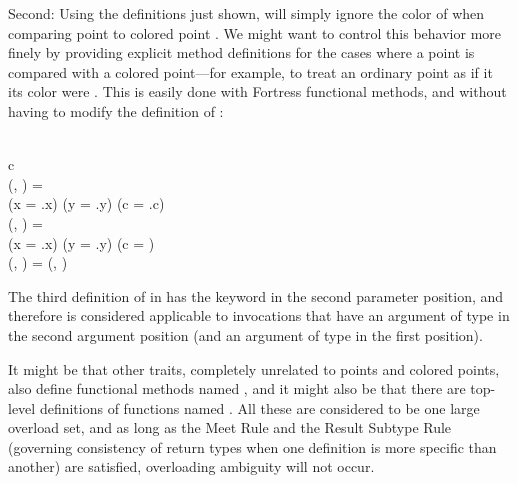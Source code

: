 Second: Using the definitions just shown,
 will simply ignore the color of  when
comparing point  to colored point .
We might want to control this behavior more finely by providing
explicit method definitions for
the cases where a point is compared with a colored point---for example,
to treat an ordinary point as if it its color were .
This is easily done with Fortress functional methods,
and without having to modify the definition of :
\begin{codeexamplesize}
\begin{FortressCode}
    \\
\2\+c\COLON {} \\
  (, \COLON {})\COLON {} = \\
  \2\+(x = .x) \wedge (y = .y) \wedge (c = .c)\- \\
  (, \COLON {})\COLON {} = \\
  \2\+(x = .x) \wedge (y = .y) \wedge (c = )\- \\
  (\COLON {}, )\COLON {} = (, )\- \\
\end{FortressCode}
\end{codeexamplesize}
The third definition of  in 
has the  keyword in the second parameter position,
and therefore is considered applicable to invocations that have
an argument of type  in the second argument position
(and an argument of type  in the first position).

It might be that other traits, completely unrelated to points
and colored points, also define functional methods
named , and it might also be that there are top-level
definitions of functions named .  All these are considered
to be one large overload set, and as long as the Meet Rule
and the Result Subtype Rule (governing consistency of return types
when one definition is more specific than another) are satisfied,
overloading ambiguity will not occur.

